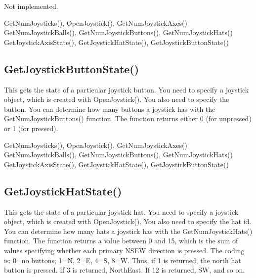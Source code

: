 \documentclass[letterpaper,10pt,english]{sphinxmanual}
\begin{document}
\sphinxAtStartPar
{}

\sphinxAtStartPar
Not implemented.

\sphinxAtStartPar
{}

\sphinxAtStartPar
GetNumJoysticks(), OpenJoystick(), GetNumJoystickAxes() GetNumJoystickBalls(), GetNumJoystickButtons(), GetNumJoystickHats() GetJoystickAxisState(), GetJoystickHatState(), GetJoystickButtonState()

\ignorespaces 

\subsection{GetJoystickButtonState()}
\label{\detokenize{reference/peblenvironment:getjoystickbuttonstate}}\label{\detokenize{reference/peblenvironment:index-14}}
\sphinxAtStartPar
{}

\sphinxAtStartPar
This gets the state of a particular joystick button.  You need to specify a joystick object, which is created with OpenJoystick().  You also need to specify the button.  You can determine how many buttons a joystick has with the GetNumJoystickButtons() function.  The function returns either 0 (for unpressed) or 1 (for pressed).

\sphinxAtStartPar
{}

\sphinxAtStartPar
GetNumJoysticks(), OpenJoystick(), GetNumJoystickAxes() GetNumJoystickBalls(), GetNumJoystickButtons(), GetNumJoystickHats() GetJoystickAxisState(), GetJoystickHatState(), GetJoystickButtonState()

\ignorespaces 

\subsection{GetJoystickHatState()}
\label{\detokenize{reference/peblenvironment:getjoystickhatstate}}\label{\detokenize{reference/peblenvironment:index-15}}
\sphinxAtStartPar
{}

\sphinxAtStartPar
{}

\sphinxAtStartPar
{}    This gets the state of a particular joystick hat.  You need to specify a joystick object, which is created with OpenJoystick().  You also need to specify the hat id.  You can determine how many hats a joystick has with the GetNumJoystickHats() function.  The function returns a value between 0 and 15, which is the sum of values specifying whether each primary NSEW direction is pressed.  The coding is: 0=no buttons; 1=N, 2=E, 4=S, 8=W.  Thus, if 1 is returned, the north hat button is pressed.  If 3 is returned, NorthEast.  If 12 is returned, SW, and so on.
\end{document}
